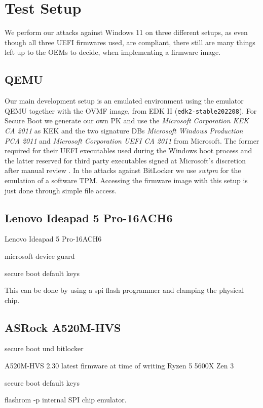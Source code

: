 
\chapter{Test Setup}
\label{sec:test-setup}

We perform our attacks against Windows 11 on three different setups, as even though all three \ac{UEFI} firmwares used, are\cite{pi-spec} compliant, there still are many things left up to the \acp{OEM} to decide, when implementing a firmware image.

\section{\acs{QEMU}}
\label{sec:test-setup:qemu}

Our main development setup is an emulated environment using the emulator \ac{QEMU}\cite{qemu} together with the \ac{OVMF} image, from \ac{EDK} II (\lstinline{edk2-stable202208}).
For Secure Boot we generate our own \ac{PK} and use the \emph{Microsoft Corporation \acs{KEK} \acs{CA} 2011} as \ac{KEK} and the two signature \acp{DB} \emph{Microsoft Windows Production PCA 2011} and \emph{Microsoft Corporation UEFI CA 2011} from Microsoft. The former required for their \ac{UEFI} executables used during the Windows boot process\cite{microsoft-secure-boot-guidance} and the latter reserved for third party executables signed at Microsoft's discretion after manual review \cite{microsoft-uefi-signing}.
In the attacks against BitLocker we use \emph{swtpm} for the emulation of a software \ac{TPM}\cite{swtpm}. Accessing the firmware image with this setup is just done through simple file access.

\section{Lenovo Ideapad 5 Pro-16ACH6}
\label{sec:test-setup:lenovo}

Lenovo Ideapad 5 Pro-16ACH6


microsoft device guard

secure boot default keys


This can be done by using a spi flash programmer and clamping the physical chip. 

\section{ASRock A520M-HVS}
\label{sec:test-setup:asrock}



secure boot und bitlocker


A520M-HVS 2.30 latest firmware at time of writing
Ryzen 5 5600X Zen 3

secure boot default keys


flashrom -p internal
SPI chip emulator. 
